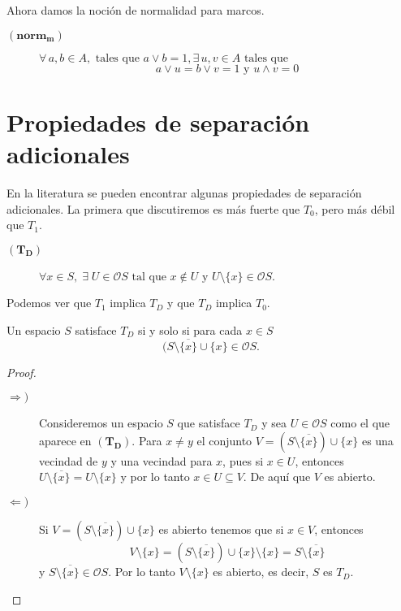 Ahora damos la noción de normalidad para marcos.

\begin{description}
\item[$(\mathbf{norm_m})$] $\forall\, a, b\in A, \mbox{ tales que } a\vee b=1, \exists\, u, v\in A\mbox{ tales que }$
\[
 a\vee u=b\vee v=1 \mbox{ y } u\wedge v=0
\]
\end{description}

\section{Propiedades de separación adicionales}

En la literatura se pueden encontrar algunas propiedades de separación adicionales. La primera que discutiremos es más fuerte que $T_0$, pero más débil que $T_1$.

\begin{description}
\item[$(\mathbf{T_D})$] $\forall x\in S,\; \exists\; U\in \mathcal{O}S \mbox{ tal que } x\notin U \mbox{ y } U\setminus\{x\} \in \mathcal{O}S$.
\end{description}

Podemos ver que $T_1$ implica $T_D$ y que $T_D$ implica $T_0$.

\begin{prop}
    Un espacio $S$ satisface $T_D$ si y solo si para cada $x\in S$
    \[
    (S\setminus \overline{\{x\}}\cup \{x\}\in \mathcal{O}S.
    \]
\end{prop}

\begin{proof}
\begin{description}
    \item[$\Rightarrow )$] Consideremos un espacio $S$ que satisface $T_D$ y sea $U\in \mathcal{O}S$ como el que aparece en $(\mathbf{T_D})$. Para $x\neq y$ el conjunto $V=(S\setminus \overline{\{x\}})\cup \{x\}$ es una vecindad de $y$ y una vecindad para $x$, pues si $x\in U$, entonces $U\setminus \overline{\{x\}}=U\setminus \{x\}$ y por lo tanto $x\in U\subseteq V$. De aquí que $V$ es abierto.
    \item[$\Leftarrow )$] Si $V=(S\setminus \overline{\{x\}})\cup \{x\}$ es abierto tenemos que si $x\in V$, entonces 
    \[
    V\setminus \{x\}=(S\setminus \overline{\{x\}})\cup \{x\}\setminus\{x\}=S\setminus \overline{\{x\}}
    \]
    y $S\setminus \overline{\{x\}}\in \mathcal{O}S$. Por lo tanto  $V\setminus \{x\}$ es abierto, es decir, $S$ es $T_D$.
\end{description}
\end{proof}

